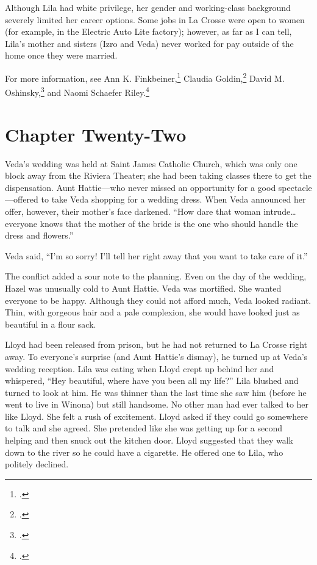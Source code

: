 \documentclass[
  american,
  letterpaper,
]{book}
\begin{document}
Although Lila had white privilege, her gender and working-class
background severely limited her career options. Some jobs in La Crosse
were open to women (for example, in the Electric Auto Lite factory);
however, as far as I can tell, Lila's mother and sisters (Izro and Veda)
never worked for pay outside of the home once they were married.

For more information, see Ann K. Finkbeiner,\footnote{.} Claudia Goldin,\footnote{.} David M. Oshinsky,\footnote{.} and Naomi
Schaefer Riley.\footnote{.}


\chapter{Chapter Twenty-Two}\label{chapter-twenty-two}

Veda's wedding was held at Saint James Catholic Church, which was only
one block away from the Riviera Theater; she had been taking classes
there to get the dispensation. Aunt Hattie---who never missed an
opportunity for a good spectacle---offered to take Veda shopping for a
wedding dress. When Veda announced her offer, however, their mother's
face darkened. ``How dare that woman intrude\ldots everyone knows that
the mother of the bride is the one who should handle the dress and
flowers.''

Veda said, ``I'm so sorry! I'll tell her right away that you want to
take care of it.''

The conflict added a sour note to the planning. Even on the day of the
wedding, Hazel was unusually cold to Aunt Hattie. Veda was mortified.
She wanted everyone to be happy. Although they could not afford much,
Veda looked radiant. Thin, with gorgeous hair and a pale complexion, she
would have looked just as beautiful in a flour sack.

Lloyd had been released from prison, but he had not returned to La
Crosse right away. To everyone's surprise (and Aunt Hattie's dismay), he
turned up at Veda's wedding reception. Lila was eating when Lloyd crept
up behind her and whispered, ``Hey beautiful, where have you been all my
life?'' Lila blushed and turned to look at him. He was thinner than the
last time she saw him (before he went to live in Winona) but still
handsome. No other man had ever talked to her like Lloyd. She felt a
rush of excitement. Lloyd asked if they could go somewhere to talk and
she agreed. She pretended like she was getting up for a second helping
and then snuck out the kitchen door. Lloyd suggested that they walk down
to the river so he could have a cigarette. He offered one to Lila, who
politely declined.
\end{document}
